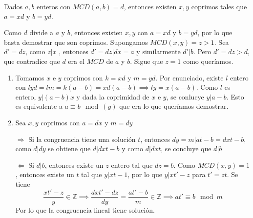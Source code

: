 \begin{claim}
        Dados $a,b$ enteros con $MCD(a,b)=d$, entonces existen $x,y$ coprimos tales que $a=xd$ y $b=yd$.
\end{claim}
    
\begin{dem}
        Como $d$ divide a $a$ y $b$, entonces existen $x,y$ con $a=xd$ y $b=yd$, por lo que basta demostrar que son coprimos. Supongamos $MCD(x,y)=z>1$. Sea $d'=dz$, como $z|x$ , entonces $d'=dz|dx=a$ y similarmente $d'|b$. Pero $d'=dz>d$, que contradice que $d$ era el $MCD$ de $a$ y $b$. Sigue que $z=1$ como queríamos.
\end{dem}
\begin{enumerate}[label=(\alph*)] 
\item Tomamos $x$ e $y$ coprimos con $k=xd$ y $m=yd$. Por enunciado, existe $l$ entero con $lyd=lm=k(a-b)=xd(a-b)\implies ly=x(a-b)$. Como $l$ es entero, $y|(a-b)x$ y dada la coprimidad de $x$ e $y$, se conlucye $y|a-b$. Esto es equivalente a $a\equiv b \mod(y)$ que era lo que queríamos demostrar.
\item Sea $x,y$ coprimos con $a=dx$ y $m=dy$

$\boxed{\Longrightarrow}$ Si la congruencia tiene una solución $t$, entonces $dy=m|at-b=dxt-b$, como $d|dy$ se obtiene que $d|dxt-b$ y como $d|dxt$, se concluye que $d|b$

$\boxed{\Longleftarrow}$ Si $d|b$, entonces existe un $z$ entero tal que $dz=b$. Como $MCD(x,y)=1$, entonces existe un $t$ tal que $y|xt-1$, por lo que $y|xt'-z$ para $t'=zt$. Se tiene \[
\frac{xt'-z}{y}\in \mathbb{Z} \implies \frac{dxt'-dz}{dy}=\frac{at'-b}{m}\in \mathbb{Z}\implies at' \equiv b \mod m
\]
Por lo que la congruencia lineal tiene solución.

\end{enumerate}
